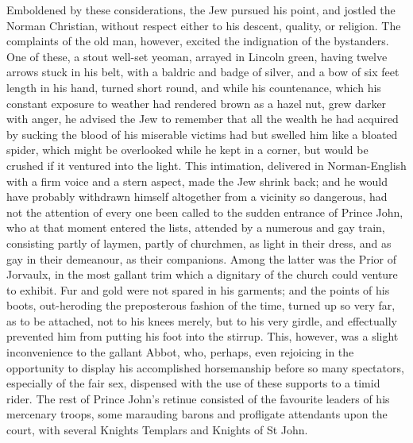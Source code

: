 Emboldened by these considerations, the Jew pursued his point, and
jostled the Norman Christian, without respect either to his descent,
quality, or religion. The complaints of the old man, however, excited
the indignation of the bystanders. One of these, a stout well-set
yeoman, arrayed in Lincoln green, having twelve arrows stuck in his
belt, with a baldric and badge of silver, and a bow of six feet length
in his hand, turned short round, and while his countenance, which his
constant exposure to weather had rendered brown as a hazel nut, grew
darker with anger, he advised the Jew to remember that all the wealth he
had acquired by sucking the blood of his miserable victims had but
swelled him like a bloated spider, which might be overlooked while he
kept in a corner, but would be crushed if it ventured into the light.
This intimation, delivered in Norman-English with a firm voice and a
stern aspect, made the Jew shrink back; and he would have probably
withdrawn himself altogether from a vicinity so dangerous, had not the
attention of every one been called to the sudden entrance of Prince
John, who at that moment entered the lists, attended by a numerous and
gay train, consisting partly of laymen, partly of churchmen, as light in
their dress, and as gay in their demeanour, as their companions. Among
the latter was the Prior of Jorvaulx, in the most gallant trim which a
dignitary of the church could venture to exhibit. Fur and gold were not
spared in his garments; and the points of his boots, out-heroding the
preposterous fashion of the time, turned up so very far, as to be
attached, not to his knees merely, but to his very girdle, and
effectually prevented him from putting his foot into the stirrup. This,
however, was a slight inconvenience to the gallant Abbot, who, perhaps,
even rejoicing in the opportunity to display his accomplished
horsemanship before so many spectators, especially of the fair sex,
dispensed with the use of these supports to a timid rider. The rest of
Prince John's retinue consisted of the favourite leaders of his
mercenary troops, some marauding barons and profligate attendants upon
the court, with several Knights Templars and Knights of St John.

